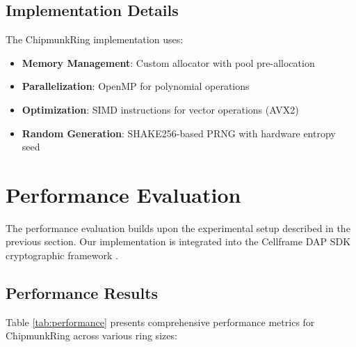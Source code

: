 \documentclass[11pt,a4paper]{article}
\begin{document}
\subsection{Implementation Details}

The ChipmunkRing implementation uses:

\begin{itemize}
\item \textbf{Memory Management}: Custom allocator with pool pre-allocation
\item \textbf{Parallelization}: OpenMP for polynomial operations
\item \textbf{Optimization}: SIMD instructions for vector operations (AVX2)
\item \textbf{Random Generation}: SHAKE256-based PRNG with hardware entropy seed
\end{itemize}

\section{Performance Evaluation}

The performance evaluation builds upon the experimental setup described in the previous section. Our implementation is integrated into the Cellframe DAP SDK cryptographic framework \cite{cellframe2023, dapsdk2024}.

\subsection{Performance Results}

Table \ref{tab:performance} presents comprehensive performance metrics for ChipmunkRing across various ring sizes:
\end{document}
